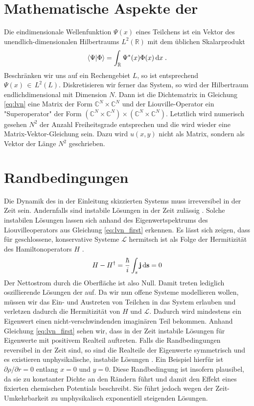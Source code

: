 \section{Mathematische Aspekte der \lvn}
Die eindimensionale Wellenfunktion $\Psi(x)$ eines Teilchens ist ein Vektor des unendlich-dimensionalen Hilbertraums $L^2(\mathbb{R})$ mit dem üblichen Skalarprodukt
\begin{align}
  \bra{\Psi}\ket{\Phi} = \int_{\mathbb{R}} \Psi^*(x)\Phi(x) \mathop{}\!\mathrm{d} x \; .
\end{align}
Beschränken wir uns auf ein Rechengebiet $L$, so ist entsprechend $\Psi(x) \,\in\,L^2(L)$. Diskretisieren wir ferner das System, so wird der Hilbertraum endlichdimensional mit Dimension $N$. Dann ist die Dichtematrix in Gleichung \eqref{eq:lvn} eine Matrix der Form $\mathbb{C}^N \times \mathbb{C}^N$ und der Liouville-Operator ein "Superoperator" \cite{frensley2} der Form $(\mathbb{C}^N \times \mathbb{C}^N)\times(\mathbb{C}^N \times \mathbb{C}^N)$. Letztlich wird numerisch gesehen $N^2$ der Anzahl Freiheitsgrade entsprechen und die \lvn wird wieder eine Matrix-Vektor-Gleichung sein. Dazu wird $u(x,y)$ nicht als Matrix, sondern als Vektor der Länge $N^2$ geschrieben.

\section{Randbedingungen}
\label{sec:RB}
Die Dynamik des in der Einleitung skizzierten Systems muss irreversibel in der Zeit sein. Andernfalls sind instabile Lösungen in der Zeit zulässig \cite{frensley2}. Solche instabilen Lösungen lassen sich anhand des Eigenwertspektrums des Liouvilleoperators aus Gleichung \eqref{eq:lvn_first} erkennen. Es lässt sich zeigen, dass für geschlossene, konservative Systeme $\mathcal{L}$ hermitsch ist als Folge der Hermitizität des Hamiltonoperators $H$ \cite{frensley2}.
\begin{align}
  H- H^{\dagger} = \frac{\hbar}{i}\int_s \vb{j}\mathop{}\!\mathrm{d}\vb{s} = 0
\end{align}
Der Nettostrom durch die Oberfläche ist also Null. Damit treten lediglich oszillierende Lösungen der \lvn auf. Da wir nun offene Systeme modellieren wollen, müssen wir das Ein- und Austreten von Teilchen in das System erlauben und verletzen dadurch die Hermitizität von $H$ und $\mathcal{L}$. Dadurch wird mindestens ein Eigenwert einen nicht-verschwindenden imaginären Teil bekommen. Anhand Gleichung \eqref{eq:lvn_first} sehen wir, dass in der Zeit instabile Lösungen für Eigenwerte mit positivem Realteil auftreten. Falls die Randbedingungen reversibel in der Zeit sind, so sind die Realteile der Eigenwerte symmetrisch und es existieren unphysikalische, instabile Lösungen \cite{frensley2}. Ein Beispiel hierfür ist $\partial \rho /\partial r = 0$ entlang $x=0$ und $y=0$. Diese Randbedingung ist insofern plausibel, da sie zu konstanter Dichte an den Rändern führt und damit den Effekt eines fixierten chemischen Potentials beschreibt. Sie führt jedoch wegen der Zeit-Umkehrbarkeit zu unphysikalisch exponentiell steigenden Lösungen.

